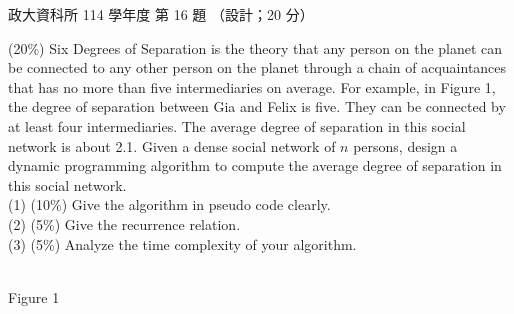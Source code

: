 \begin{pastexam}[label={px:nccu-114-dsa-16}]{政大資科所 114 學年度 第 16 題}
（設計；20 分）

(20\%) Six Degrees of Separation is the theory that any person on the planet can be connected to
any other person on the planet through a chain of acquaintances that has no more than five
intermediaries on average. For example, in Figure 1, the degree of separation between Gia and
Felix is five. They can be connected by at least four intermediaries. The average degree of
separation in this social network is about 2.1. Given a dense social network of $n$ persons,
design a dynamic programming algorithm to compute the average degree of separation in this social
network.\\
(1) (10\%) Give the algorithm in pseudo code clearly.\\
(2) (5\%) Give the recurrence relation.\\
(3) (5\%) Analyze the time complexity of your algorithm.
\begin{center}
\\
Figure 1
\end{center}
\end{pastexam}

